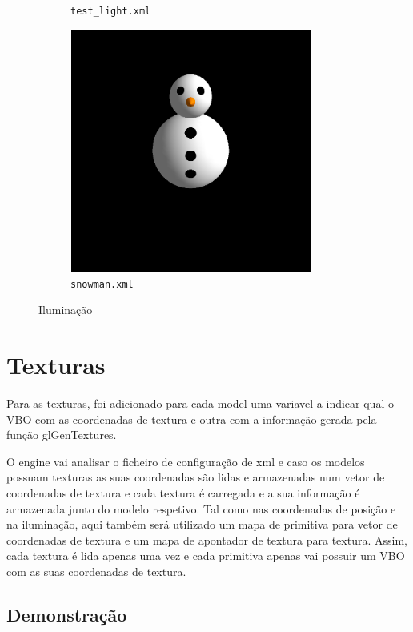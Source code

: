 \documentclass[11pt,a4paper]{report}
\begin{document}
\begin{figure}[H]
\begin{subfigure}{0.5\textwidth}
  \caption{\texttt{test\_light.xml}}
  \label{fig:test_light}
\end{subfigure}%
\begin{subfigure}{0.5\textwidth}
  \centering
  \includegraphics[width = 8cm,height = 8cm]{snowman.png}
  \caption{\texttt{snowman.xml}}
  \label{fig:snowman}
\end{subfigure}
\caption{Iluminação}
\end{figure}

\newpage
\section{Texturas}
Para as texturas, foi adicionado para cada model uma variavel a indicar qual o VBO com as coordenadas de textura e outra com a informação gerada pela função glGenTextures.

O engine vai analisar o ficheiro de configuração de xml e caso os modelos possuam texturas as suas coordenadas são lidas e armazenadas num vetor de coordenadas de textura e cada textura é carregada e a sua informação é armazenada junto do modelo respetivo.
Tal como nas coordenadas de posição e na iluminação, aqui também será utilizado um mapa de primitiva para vetor de coordenadas de textura e um mapa de apontador de textura para textura. Assim, cada textura é lida apenas uma vez e cada primitiva apenas vai possuir um VBO com as suas coordenadas de textura.

\subsection{Demonstração}
\end{document}
